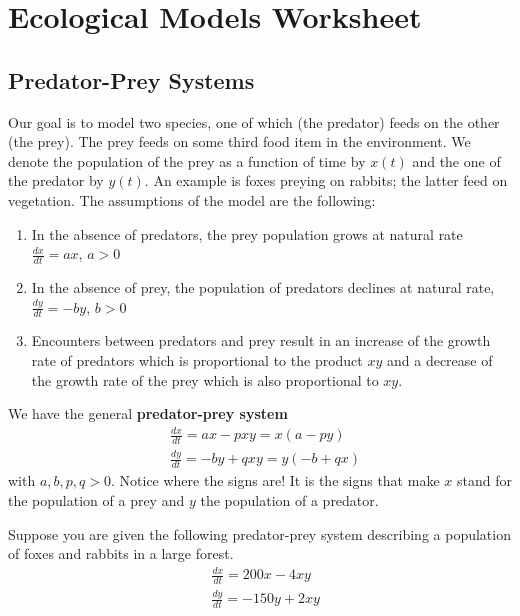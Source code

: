 \documentclass[11pt]{article}
\date{}
\begin{document}
\section*{Ecological Models Worksheet}


\subsection*{Predator-Prey Systems}
Our goal is to model two species, one of which (the predator) feeds on the other (the prey). The prey feeds on some third food item in the environment.
We denote the population of the prey as a function of time by $x(t)$ and the one of the predator by $y(t)$.
An example is foxes preying on rabbits; the latter feed on vegetation.
The assumptions of the model are the following:
\begin{enumerate}
	\item In the absence of predators, the prey population grows at natural rate $\frac{dx}{dt}=ax$, $a>0$
	\item In the absence of prey, the population of predators declines  at natural rate, $\frac{dy}{dt}=-by$, $b>0$
	\item Encounters between predators and prey result in an increase of the growth rate of predators which is proportional to the product $xy$ and a decrease of the growth rate of the prey which is also proportional to $xy$.
\end{enumerate}
We have the general \textbf{predator-prey system}
\begin{equation}
	\begin{aligned}
		&\frac{dx}{dt}=ax-pxy = x(a-py)\\	
		&\frac{dy}{dt}=-by+qxy=y(-b+qx)
	\end{aligned}
\end{equation}
with $a,b,p,q>0$.
Notice where the signs are! It is the signs that make $x$ stand for the population of a prey and $y$ the population of a predator.

\begin{example}
	Suppose you are given the following predator-prey system describing a population of foxes and rabbits in a large forest.
	\begin{equation}\label{predator-prey}
	\begin{aligned}
		&\frac{dx}{dt}=200x-4xy \\	
		&\frac{dy}{dt}=-150y+2xy
	\end{aligned}
\end{equation}
\end{example}
\end{document}

